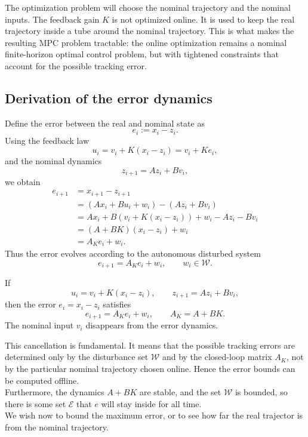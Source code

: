 The optimization problem will choose the nominal trajectory and the nominal inputs. The
feedback gain \(K\) is not optimized online. It is used to keep the real trajectory inside a tube
around the nominal trajectory. This is what makes the resulting MPC problem tractable: the
online optimization remains a nominal finite-horizon optimal control problem, but with tightened
constraints that account for the possible tracking error.

\subsection{Derivation of the error dynamics}

Define the error between the real and nominal state as
\[
    e_i:=x_i-z_i.
\]
Using the feedback law
\[
    u_i=v_i+K(x_i-z_i)=v_i+Ke_i,
\]
and the nominal dynamics
\[
    z_{i+1}=Az_i+Bv_i,
\]
we obtain
\[
\begin{aligned}
    e_{i+1}
    &=
    x_{i+1}-z_{i+1}                                                    \\
    &=
    \left(Ax_i+Bu_i+w_i\right)-\left(Az_i+Bv_i\right)                  \\
    &=
    Ax_i+B\left(v_i+K(x_i-z_i)\right)+w_i-Az_i-Bv_i                    \\
    &=
    (A+BK)(x_i-z_i)+w_i                                                \\
    &=
    A_K e_i+w_i.
\end{aligned}
\]
Thus the error evolves according to the autonomous disturbed system
\[
    e_{i+1}=A_K e_i+w_i,
    \qquad w_i\in\mathcal W.
\]

\begin{theorembox}
If
\[
    u_i=v_i+K(x_i-z_i),
    \qquad
    z_{i+1}=Az_i+Bv_i,
\]
then the error \(e_i=x_i-z_i\) satisfies
\[
    e_{i+1}=A_K e_i+w_i,
    \qquad A_K=A+BK.
\]
The nominal input \(v_i\) disappears from the error dynamics.
\end{theorembox}

This cancellation is fundamental. It means that the possible tracking errors are determined only
by the disturbance set \(\mathcal W\) and by the closed-loop matrix \(A_K\), not by the particular
nominal trajectory chosen online. Hence the error bounds can be computed offline.\\
Furthermore, the dynamics $A+BK$ are stable, and the set $\mathcal W$ is bounded, so there is some set $\mathcal E$ that $e$ will stay inside for all time.\\
We wish now to bound the maximum error, or to see how far the real trajector is from the nominal trajectory.

